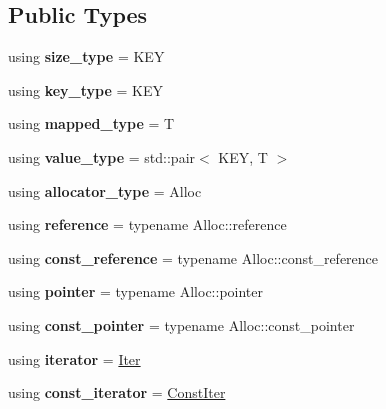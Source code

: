 \subsection*{Public Types}
\begin{DoxyCompactItemize}
\item 
\mbox{\label{classtheoria_1_1util_1_1densemap_a133075e61db44e086c734c8a32ca6ab2}} 
using {\bfseries size\+\_\+type} = K\+EY
\item 
\mbox{\label{classtheoria_1_1util_1_1densemap_afd285a46dc8f45b4b1556a656708d2a7}} 
using {\bfseries key\+\_\+type} = K\+EY
\item 
\mbox{\label{classtheoria_1_1util_1_1densemap_a8c1e5a57a1e76089bd675da3fa3347d8}} 
using {\bfseries mapped\+\_\+type} = T
\item 
\mbox{\label{classtheoria_1_1util_1_1densemap_a6d2419665695def56b2abbd849f74b08}} 
using {\bfseries value\+\_\+type} = std\+::pair$<$ K\+EY, T $>$
\item 
\mbox{\label{classtheoria_1_1util_1_1densemap_ae12f4688e504c8759e23759ad7272c94}} 
using {\bfseries allocator\+\_\+type} = Alloc
\item 
\mbox{\label{classtheoria_1_1util_1_1densemap_a20361bfcacef17947099d8580befbbdc}} 
using {\bfseries reference} = typename Alloc\+::reference
\item 
\mbox{\label{classtheoria_1_1util_1_1densemap_a7a3dd11d6fd160c467c43d2029c3592a}} 
using {\bfseries const\+\_\+reference} = typename Alloc\+::const\+\_\+reference
\item 
\mbox{\label{classtheoria_1_1util_1_1densemap_ae892a1fc35162971bb0278c7904995c6}} 
using {\bfseries pointer} = typename Alloc\+::pointer
\item 
\mbox{\label{classtheoria_1_1util_1_1densemap_ab19ebc07bf788b5689adaa3a80b46c31}} 
using {\bfseries const\+\_\+pointer} = typename Alloc\+::const\+\_\+pointer
\item 
\mbox{\label{classtheoria_1_1util_1_1densemap_a4ee170442110252d3033534246f9677f}} 
using {\bfseries iterator} = \hyperlink{classtheoria_1_1util_1_1densemap_1_1Iter}{Iter}
\item 
\mbox{\label{classtheoria_1_1util_1_1densemap_a8c2937f8e4ba47abf344d9f9f23f0c88}} 
using {\bfseries const\+\_\+iterator} = \hyperlink{classtheoria_1_1util_1_1densemap_1_1ConstIter}{Const\+Iter}
\end{DoxyCompactItemize}
